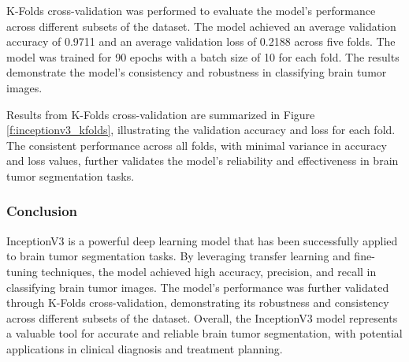 
K-Folds cross-validation was performed to evaluate the model's performance across different subsets of the dataset. The model achieved an average validation accuracy of 0.9711 and an average validation loss of 0.2188 across five folds. The model was trained for 90 epochs with a batch size of 10 for each fold. The results demonstrate the model's consistency and robustness in classifying brain tumor images.

Results from K-Folds cross-validation are summarized in Figure \ref{f:inceptionv3_kfolds}, illustrating the validation accuracy and loss for each fold. The consistent performance across all folds, with minimal variance in accuracy and loss values, further validates the model's reliability and effectiveness in brain tumor segmentation tasks.

\subsubsection{Conclusion}

InceptionV3 is a powerful deep learning model that has been successfully applied to brain tumor segmentation tasks. By leveraging transfer learning and fine-tuning techniques, the model achieved high accuracy, precision, and recall in classifying brain tumor images. The model's performance was further validated through K-Folds cross-validation, demonstrating its robustness and consistency across different subsets of the dataset. Overall, the InceptionV3 model represents a valuable tool for accurate and reliable brain tumor segmentation, with potential applications in clinical diagnosis and treatment planning.
